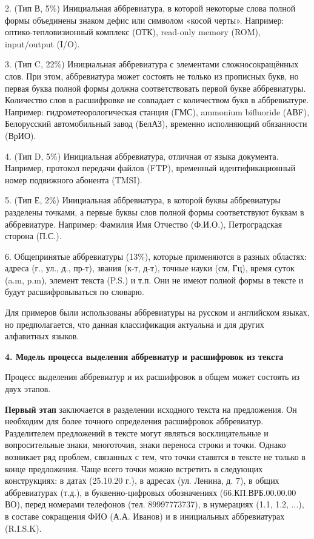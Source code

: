 \documentclass[12pt]{article}
\begin{document}
    2. (Тип В, 5\%) Инициальная аббревиатура, в которой некоторые слова полной формы объединены знаком дефис или символом «косой черты». Например: оптико-тепловизионный комплекс (ОТК), read-only memory (ROM), input/output (I/O).

    3. (Тип C, 22\%) Инициальная аббревиатура с элементами сложносокращённых слов. При этом, аббревиатура может состоять не только из прописных букв, но первая буква полной формы должна соответствовать первой букве аббревиатуры. Количество слов в расшифровке не совпадает с количеством букв в аббревиатуре. Например: гидрометеорологическая станция (ГМС), ammonium bifluoride (АВF), Белорусский автомобильный завод (БелАЗ), временно исполняющий обязанности (ВрИО).

    4. (Тип D, 5\%) Инициальная аббревиатура, отличная от языка документа. Например, протокол передачи файлов (FTP), временный идентификационный номер подвижного абонента (TMSI).

    5. (Тип Е, 2\%) Инициальная аббревиатура, в которой буквы аббревиатуры разделены точками, а первые буквы слов полной формы соответствуют буквам в аббревиатуре. Например: Фамилия Имя Отчество (Ф.И.О.), Петроградская сторона (П.С.).

    6. Общепринятые аббревиатуры (13\%), которые применяются в разных областях: адреса (г., ул., д., пр-т), звания (к-т, д-т), точные науки (см, Гц), время суток (a.m, p.m), элемент текста (P.S.) и т.п. Они не имеют полной формы в тексте и будут расшифровываться по словарю.

\indent Для примеров были использованы аббревиатуры на русском и английском языках, но предполагается, что данная классификация актуальна и для других алфавитных языков.

\vspace{1cm}

\textbf{4. Модель процесса выделения аббревиатур и расшифровок из текста}

\indent Процесс выделения аббревиатур и их расшифровок в общем может состоять из двух этапов.

\indent \textbf{Первый этап} заключается в разделении исходного текста на предложения. Он необходим для более точного определения расшифровок аббревиатур. Разделителем предложений в тексте могут являться восклицательные и вопросительные знаки, многоточия, знаки переноса строки и точки. Однако возникает ряд проблем, связанных с тем, что точки ставятся в тексте не только в конце предложения. Чаще всего точки можно встретить в следующих конструкциях: в датах (25.10.20 г.), в адресах (ул. Ленина, д. 7), в общих аббревиатурах (т.д.), в буквенно-цифровых обозначениях (66.КП.ВРБ.00.00.00 ВО), перед номерами телефонов (тел. 89997773737), в нумерациях (1.1, 1.2, ...), в составе сокращения ФИО (А.А. Иванов) и в инициальных аббревиатурах (R.I.S.K).
\end{document}
